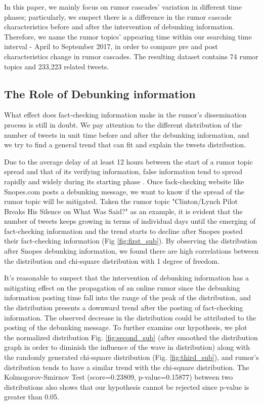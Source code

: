 \documentclass[conference]{IEEEtran}
\begin{document}
	In this paper, we mainly focus on rumor cascades' variation in different time phases; particularly, we suspect there is a difference in the rumor cascade characteristics before and after the intervention of debunking information. Therefore, we name the rumor topics' appearing time within our searching time interval - April to September 2017, in order to compare pre and post characteristics change in rumor cascades. The resulting dataset contains 74 rumor topics and 233,223 related tweets. 
	
	\subsection{The Role of Debunking information}
	What effect does fact-checking information make in the rumor's dissemination process is still in doubt. We pay attention to the different distribution of the number of tweets in unit time before and after the debunking information, and we try to find a general trend that can fit and explain the tweets distribution. 
	
	Due to the average delay of at least 12 hours between the start of a rumor topic spread and that of its verifying information, false information tend to spread rapidly and widely during its starting phase \cite{kumar2016disinformation, zubiaga2016analysing}. Once fack-checking website like Snopes.com posts a debunking message, we want to know if the spread of the rumor topic will be mitigated. Taken the rumor topic "Clinton/Lynch Pilot Breaks His Silence on What Was Said?" as an example, it is evident that the number of tweets keeps growing in terms of individual days until the emerging of fact-checking information and the trend starts to decline after Snopes posted their fact-checking information (Fig \ref{fig:first_sub}). By observing the distribution after Snopes debunking information, we found there are high correlations between the distribution and chi-square distribution with 1 degree of freedom. 
	
	It's reasonable to suspect that the intervention of debunking information has a mitigating effect on the propagation of an online rumor since the debunking information posting time fall into the range of the peak of the distribution, and the distribution presents a downward trend after the posting of fact-checking information. The observed decrease in the distribution could be attributed to the posting of the debunking message. To further examine our hypothesis, we plot the normalized distribution Fig. \ref{fig:second_sub} (after smoothed the distribution graph in order to diminish the influence of the wave in distribution) along with the randomly generated chi-square distribution (Fig. \ref{fig:third_sub}), and rumor's distribution tends to have a similar trend with the chi-square distribution. The Kolmogorov-Smirnov Test (score=0.23809, p-value=0.15877) between two distributions also shows that our hypothesis cannot be rejected since p-value is greater than 0.05.
	
\end{document}

